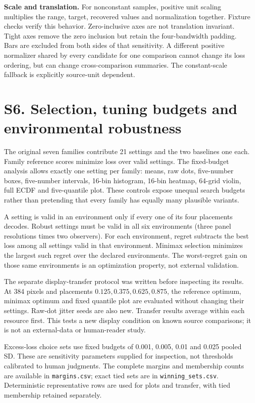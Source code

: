 \documentclass[10pt]{article}
\begin{document}
\textbf{Scale and translation.} For nonconstant samples, positive unit scaling multiplies the range, target, recovered values and normalization together. Fixture checks verify this behavior. Zero-inclusive axes are not translation invariant. Tight axes remove the zero inclusion but retain the four-bandwidth padding. Bars are excluded from both sides of that sensitivity. A different positive normalizer shared by every candidate for one comparison cannot change its loss ordering, but can change cross-comparison summaries. The constant-scale fallback is explicitly source-unit dependent.

\section*{S6. Selection, tuning budgets and environmental robustness}
The original seven families contribute 21 settings and the two baselines one each. Family reference scores minimize loss over valid settings. The fixed-budget analysis allows exactly one setting per family: means, raw dots, five-number boxes, five-number intervals, 16-bin histogram, 16-bin heatmap, 64-grid violin, full ECDF and five-quantile plot. These controls expose unequal search budgets rather than pretending that every family has equally many plausible variants.

A setting is valid in an environment only if every one of its four placements decodes. Robust settings must be valid in all six environments (three panel resolutions times two observers). For each environment, regret subtracts the best loss among all settings valid in that environment. Minimax selection minimizes the largest such regret over the declared environments. The worst-regret gain on those same environments is an optimization property, not external validation.

The separate display-transfer protocol was written before inspecting its results. At 384 pixels and placements $0.125,0.375,0.625,0.875$, the reference optimum, minimax optimum and fixed quantile plot are evaluated without changing their settings. Raw-dot jitter seeds are also new. Transfer results average within each resource first. This tests a new display condition on known source comparisons; it is not an external-data or human-reader study.



Excess-loss choice sets use fixed budgets of 0.001, 0.005, 0.01 and 0.025 pooled SD. These are sensitivity parameters supplied for inspection, not thresholds calibrated to human judgments. The complete margins and membership counts are available in \texttt{margins.csv}; exact tied sets are in \texttt{winning\_sets.csv}. Deterministic representative rows are used for plots and transfer, with tied membership retained separately.
\end{document}
